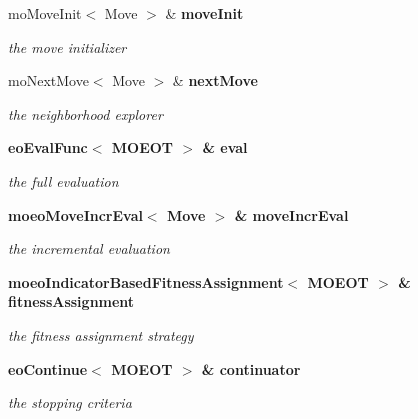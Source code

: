 \begin{CompactItemize}
\item 
mo\-Move\-Init$<$ Move $>$ \& \bf{move\-Init}\label{classmoeoIBMOLS_b4b4908b893edd52d6fa24085d2a89e5}

\begin{CompactList}\small\item\em the move initializer \item\end{CompactList}\item 
mo\-Next\-Move$<$ Move $>$ \& \bf{next\-Move}\label{classmoeoIBMOLS_8b8ebbd6eb6c82caa796160b4be2a86b}

\begin{CompactList}\small\item\em the neighborhood explorer \item\end{CompactList}\item 
\bf{eo\-Eval\-Func}$<$ MOEOT $>$ \& \bf{eval}\label{classmoeoIBMOLS_e9acda4b2f61f8960109a8c6fd52551e}

\begin{CompactList}\small\item\em the full evaluation \item\end{CompactList}\item 
\bf{moeo\-Move\-Incr\-Eval}$<$ Move $>$ \& \bf{move\-Incr\-Eval}\label{classmoeoIBMOLS_6c38636061bd03c4be809277e2dc257a}

\begin{CompactList}\small\item\em the incremental evaluation \item\end{CompactList}\item 
\bf{moeo\-Indicator\-Based\-Fitness\-Assignment}$<$ MOEOT $>$ \& \bf{fitness\-Assignment}\label{classmoeoIBMOLS_f48840d7af306db440e74028ed736a95}

\begin{CompactList}\small\item\em the fitness assignment strategy \item\end{CompactList}\item 
\bf{eo\-Continue}$<$ MOEOT $>$ \& \bf{continuator}\label{classmoeoIBMOLS_c15985c0bb5d9ba835f35d99d7c42b14}

\begin{CompactList}\small\item\em the stopping criteria \item\end{CompactList}\end{CompactItemize}


